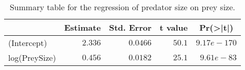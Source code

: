 \begin{table}[!htbp]
\caption{Summary table for the regression of predator size 
  on prey size.\label{tab:Size}} 
\begin{center}
\begin{tabular}{lrrrr}
\hline
\multicolumn{1}{l}{}&\multicolumn{1}{c}{Estimate}&\multicolumn{1}{c}{Std. Error}&\multicolumn{1}{c}{t value}&\multicolumn{1}{c}{Pr(\textgreater |t|)}\tabularnewline
\hline
(Intercept)&$2.336$&$0.0466$&$50.1$&$9.17e-170$\tabularnewline
log(PreySize)&$0.456$&$0.0182$&$25.1$&$ 9.61e-83$\tabularnewline
\hline
\end{tabular}\end{center}
\end{table}
